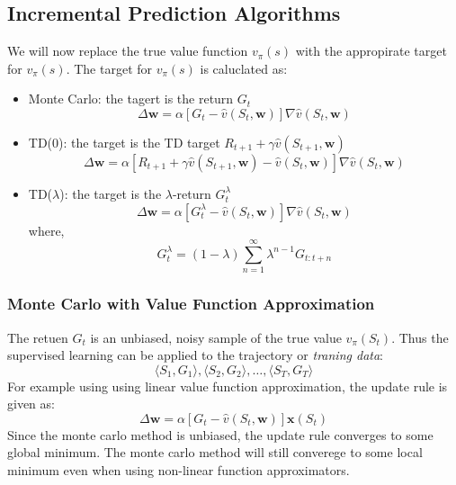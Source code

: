 \subsection{Incremental Prediction Algorithms}
We will now replace the true value function \(v_{\pi}(s)\) with the appropirate target
for \(v_{\pi}(s)\). The target for \(v_{\pi}(s)\) is caluclated as:
\begin{itemize}
    \item Monte Carlo: the tagert is the return \(G_t\)
    \[
        \Delta \mathbf{w} = \alpha \left[ 
            G_t - \hat{v}(S_t,\mathbf{w})
         \right] \nabla \hat{v}(S_t,\mathbf{w})  
    \]
    \item TD(0): the target is the TD target \(R_{t+1} + \gamma \hat{v}(S_{t+1},\mathbf{w})\)
    \[
        \Delta \mathbf{w} = \alpha \left[ 
            R_{t+1} + \gamma \hat{v}(S_{t+1},\mathbf{w}) - \hat{v}(S_t,\mathbf{w})
         \right] \nabla \hat{v}(S_t,\mathbf{w})
    \]
    \item TD(\(\lambda\)): the target is the \(\lambda\)-return  \(G_t^{\lambda}\)
    \[
        \Delta \mathbf{w} = \alpha \left[ 
            G_t^{\lambda} - \hat{v}(S_t,\mathbf{w})
         \right] \nabla \hat{v}(S_t,\mathbf{w})
    \]
    where,
    \[
        G_t^{\lambda} = (1-\lambda) \sum_{n=1}^{\infty} \lambda^{n-1} G_{t:t+n}  
    \]
\end{itemize} 

\subsubsection{Monte Carlo with Value Function Approximation}
The retuen \(G_t\) is an unbiased, noisy sample of the true value \(v_{\pi}(S_t)\). Thus the
supervised learning can be applied to the trajectory or \emph{traning data}:
\[
    \langle S_1,G_1 \rangle, \langle S_2,G_2 \rangle, \dots, \langle S_T,G_T \rangle
\]
For example using using linear value function approximation, the update rule is given as:
\[
    \Delta \mathbf{w} = \alpha \left[ 
        G_t - \hat{v}(S_t,\mathbf{w})
     \right] \mathbf{x}(S_t)
\]
Since the monte carlo method is unbiased, the update rule converges to some global minimum.
The monte carlo method will still converege to some local minimum even when using non-linear
function approximators.


